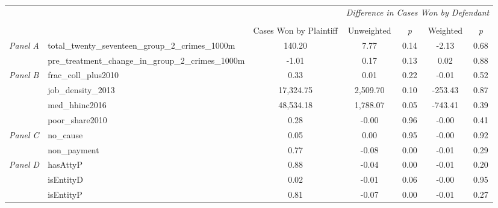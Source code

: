 \begin{tabular}{llccccc}
\toprule
 &  & \textit{} & \multicolumn{4}{c}{\textit{Difference in Cases Won by Defendant}} \\
\cline{4-7}
\\
 &  & Cases Won by Plaintiff & Unweighted & \emph{p} & Weighted & \emph{p} \\
\midrule
\multirow[c]{2}{3cm}{\textit{Panel A}} & total_twenty_seventeen_group_2_crimes_1000m & 140.20 & 7.77 & 0.14 & -2.13 & 0.68 \\
 & pre_treatment_change_in_group_2_crimes_1000m & -1.01 & 0.17 & 0.13 & 0.02 & 0.88 \\
\cline{1-7}
\multirow[c]{4}{3cm}{\textit{Panel B}} & frac_coll_plus2010 & 0.33 & 0.01 & 0.22 & -0.01 & 0.52 \\
 & job_density_2013 & 17,324.75 & 2,509.70 & 0.10 & -253.43 & 0.87 \\
 & med_hhinc2016 & 48,534.18 & 1,788.07 & 0.05 & -743.41 & 0.39 \\
 & poor_share2010 & 0.28 & -0.00 & 0.96 & -0.00 & 0.41 \\
\cline{1-7}
\multirow[c]{2}{3cm}{\textit{Panel C}} & no_cause & 0.05 & 0.00 & 0.95 & -0.00 & 0.92 \\
 & non_payment & 0.77 & -0.08 & 0.00 & -0.01 & 0.29 \\
\cline{1-7}
\multirow[c]{3}{3cm}{\textit{Panel D}} & hasAttyP & 0.88 & -0.04 & 0.00 & -0.01 & 0.20 \\
 & isEntityD & 0.02 & -0.01 & 0.06 & -0.00 & 0.95 \\
 & isEntityP & 0.81 & -0.07 & 0.00 & -0.01 & 0.27 \\
\cline{1-7}
\bottomrule
\end{tabular}
